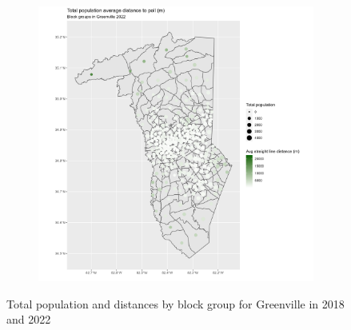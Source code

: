 \documentclass[11pt]{article}
\theoremstyle{remark}
\theoremstyle{definition}
\begin{document}
\begin{figure}
\begin{subfigure}{.5\textwidth}
		\includegraphics[width=\linewidth]{result_analysis/Greenville_SC_original_configs/population_pop_and_dist_Greenville_config_original_2022_polls.png}
		\label{sfig:Greenville_2022_bg_dist}
	\end{subfigure}
	\caption{Total population and distances by block group for Greenville in 2018 and 2022}
	\label{fig:Greenville distance Total population maps}
\end{figure}
\end{document}
